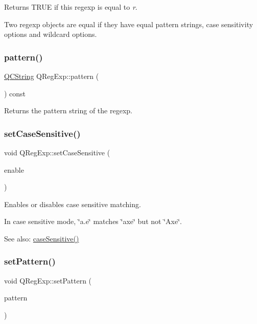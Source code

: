 Returns T\+R\+UE if this regexp is equal to {\itshape r}.

Two regexp objects are equal if they have equal pattern strings, case sensitivity options and wildcard options. \mbox{\label{class_q_reg_exp_ad2b7d2452926d97a5203ea1c1247a357}} 
\subsubsection{\texorpdfstring{pattern()}{pattern()}}
{\footnotesize\ttfamily \mbox{\hyperlink{class_q_c_string}{Q\+C\+String}} Q\+Reg\+Exp\+::pattern (\begin{DoxyParamCaption}{ }\end{DoxyParamCaption}) const\hspace{0.3cm}{\ttfamily [inline]}}

Returns the pattern string of the regexp. \mbox{\label{class_q_reg_exp_a99dd9f410cfa14efda7990bac1fd089e}} 
\subsubsection{\texorpdfstring{setCaseSensitive()}{setCaseSensitive()}}
{\footnotesize\ttfamily void Q\+Reg\+Exp\+::set\+Case\+Sensitive (\begin{DoxyParamCaption}\item[{bool}]{enable }\end{DoxyParamCaption})}

Enables or disables case sensitive matching.

In case sensitive mode, \char`\"{}a.\+e\char`\"{} matches \char`\"{}axe\char`\"{} but not \char`\"{}\+Axe\char`\"{}.

See also\+: \mbox{\hyperlink{class_q_reg_exp_ae1e5a7363426ebf095c2312ad5472a35}{case\+Sensitive()}} \mbox{\label{class_q_reg_exp_ad40709cbfe75f759293e00142367e7cb}} 
\subsubsection{\texorpdfstring{setPattern()}{setPattern()}}
{\footnotesize\ttfamily void Q\+Reg\+Exp\+::set\+Pattern (\begin{DoxyParamCaption}\item[{const \mbox{\hyperlink{class_q_c_string}{Q\+C\+String}} \&}]{pattern }\end{DoxyParamCaption})\hspace{0.3cm}{\ttfamily [inline]}}

